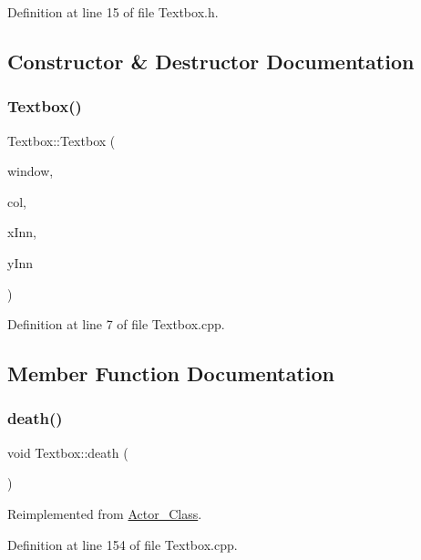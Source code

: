 Definition at line 15 of file Textbox.\+h.



\subsection{Constructor \& Destructor Documentation}
\hypertarget{class_textbox_ada0c266e63758f57f6f9c88daed041bd}{}\label{class_textbox_ada0c266e63758f57f6f9c88daed041bd} 
\subsubsection{\texorpdfstring{Textbox()}{Textbox()}}
{\footnotesize\ttfamily Textbox\+::\+Textbox (\begin{DoxyParamCaption}\item[{sf\+::\+Render\+Window \&}]{window,  }\item[{\hyperlink{class_collision}{Collision}}]{col,  }\item[{int}]{x\+Inn,  }\item[{int}]{y\+Inn }\end{DoxyParamCaption})}



Definition at line 7 of file Textbox.\+cpp.



\subsection{Member Function Documentation}
\hypertarget{class_textbox_a830cca6316662b4c7a1ae1d2f844f9ae}{}\label{class_textbox_a830cca6316662b4c7a1ae1d2f844f9ae} 
\subsubsection{\texorpdfstring{death()}{death()}}
{\footnotesize\ttfamily void Textbox\+::death (\begin{DoxyParamCaption}{ }\end{DoxyParamCaption})\hspace{0.3cm}{\ttfamily [virtual]}}



Reimplemented from \hyperlink{class_actor___class_a9447c6154a674d7e6bdf24ff2874b7a8}{Actor\+\_\+\+Class}.



Definition at line 154 of file Textbox.\+cpp.

